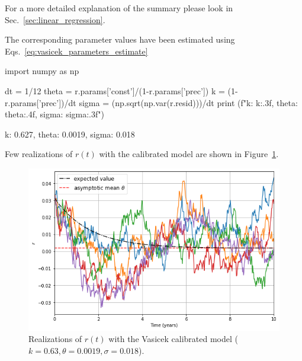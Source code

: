 For a more detailed explanation of the summary please look in Sec.~\ref{sec:linear_regression}.
%
%

The corresponding parameter values have been estimated using Eqs.~\ref{eq:vasicek_parameters_estimate}
\begin{ipython}
import numpy as np

dt = 1/12
theta = r.params['const']/(1-r.params['prec'])
k = (1-r.params['prec'])/dt
sigma = (np.sqrt(np.var(r.resid)))/dt
print (f"k: {k:.3f}, theta: {theta:.4f}, sigma: {sigma:.3f}")
\end{ipython}
\begin{ioutput}
k: 0.627, theta: 0.0019, sigma: 0.018
\end{ioutput}
Few realizations of $r(t)$ with the calibrated model are shown in Figure~\ref{fig:vasicek_calibrated_paths}.

\begin{figure}[htb]
\centering
\includegraphics[width=0.7\linewidth]{figures/vasicek_calibrated_paths}
\caption{Realizations of $r(t)$ with the Vasicek calibrated model ($k=0.63, \theta=0.0019, \sigma=0.018$).}
\label{fig:vasicek_calibrated_paths}
\end{figure}

